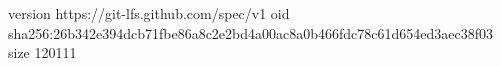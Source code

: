 version https://git-lfs.github.com/spec/v1
oid sha256:26b342e394dcb71fbe86a8c2e2bd4a00ac8a0b466fdc78c61d654ed3aec38f03
size 120111
